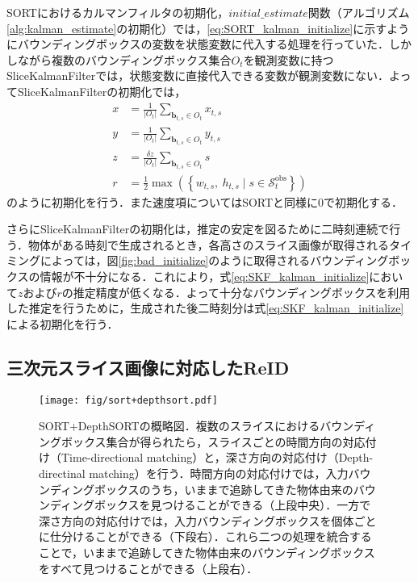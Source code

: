             SORTにおけるカルマンフィルタの初期化，$initial\_estimate$関数（アルゴリズム\ref{alg:kalman_estimate}の初期化）では，\ref{eq:SORT_kalman_initialize}に示すようにバウンディングボックスの変数を状態変数に代入する処理を行っていた．しかしながら複数のバウンディングボックス集合$O_t$を観測変数に持つSliceKalmanFilterでは，状態変数に直接代入できる変数が観測変数にない．よってSliceKalmanFilterの初期化では，
            \begin{equation}
                \label{eq:SKF_kalman_initialize}
                \begin{aligned}
                    x &= \frac{1}{\left|O_t\right|} \sum_{\bm{b}_{t,s} \in O_t} x_{t,s}
                    \\ y &= \frac{1}{\left|O_t\right|} \sum_{\bm{b}_{t,s} \in O_t} y_{t,s}
                    \\ z &= \frac{\delta z}{\left|O_t\right|} \sum_{\bm{b}_{t,s} \in O_t} s 
                    \\ r &= \frac{1}{2} \max \left(\left\{w_{t,s}, ~ h_{t,s} \mid s \in \mathcal{S}_t^{\text{obs}}\right\}\right)
                \end{aligned}
            \end{equation}
            のように初期化を行う．また速度項についてはSORTと同様に$0$で初期化する．

            さらにSliceKalmanFilterの初期化は，推定の安定を図るために二時刻連続で行う．物体がある時刻で生成されるとき，各高さのスライス画像が取得されるタイミングによっては，図\ref{fig:bad_initialize}のように取得されるバウンディングボックスの情報が不十分になる．これにより，式\ref{eq:SKF_kalman_initialize}において$z$および$r$の推定精度が低くなる．よって十分なバウンディングボックスを利用した推定を行うために，生成された後二時刻分は式\ref{eq:SKF_kalman_initialize}による初期化を行う．

    \subsection{三次元スライス画像に対応したReID}
    \label{subsec:re-identificataion_for_slice}

    \begin{figure}[t]
        \centering
        \texttt{[image: fig/sort+depthsort.pdf]}
        \caption[SORT+DepthSORTの概略図]{SORT+DepthSORTの概略図．複数のスライスにおけるバウンディングボックス集合が得られたら，スライスごとの時間方向の対応付け（Time-directional matching）と，深さ方向の対応付け（Depth-directinal matching）を行う．時間方向の対応付けでは，入力バウンディングボックスのうち，いままで追跡してきた物体由来のバウンディングボックスを見つけることができる（上段中央）．一方で深さ方向の対応付けでは，入力バウンディングボックスを個体ごとに仕分けることができる（下段右）．これら二つの処理を統合することで，いままで追跡してきた物体由来のバウンディングボックスをすべて見つけることができる（上段右）．}
        \label{fig:sort_depthsort}
    \end{figure}

